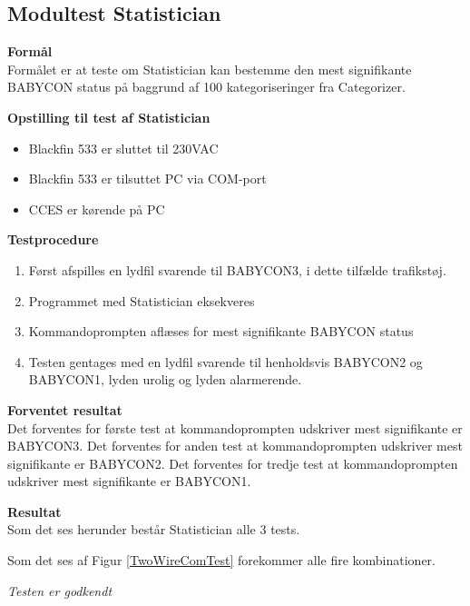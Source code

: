 \subsection{Modultest Statistician}

\textbf{Formål} \\
Formålet er at teste om Statistician kan bestemme den mest signifikante BABYCON status på baggrund af 100 kategoriseringer fra Categorizer.

\textbf{Opstilling til test af Statistician}

\begin{itemize}
	\item Blackfin 533 er sluttet til 230VAC
	\item Blackfin 533 er tilsuttet PC via COM-port
	\item CCES er kørende på PC
\end{itemize}

\textbf{Testprocedure}
\begin{enumerate}
	\item Først afspilles en lydfil svarende til BABYCON3, i dette tilfælde trafikstøj.
	\item Programmet med Statistician eksekveres 
	\item Kommandoprompten aflæses for mest signifikante BABYCON status
	\item Testen gentages med en lydfil svarende til henholdsvis BABYCON2 og BABYCON1, lyden urolig og lyden alarmerende. 
\end{enumerate}

\textbf{Forventet resultat} \\
Det forventes for første test at kommandoprompten udskriver mest signifikante er BABYCON3.
Det forventes for anden test at kommandoprompten udskriver mest signifikante er BABYCON2.
Det forventes for tredje test at kommandoprompten udskriver mest signifikante er BABYCON1. 

\textbf{Resultat} \\
Som det ses herunder består Statistician alle 3 tests. 


Som det ses af Figur \ref{TwoWireComTest} forekommer alle fire kombinationer. \\



\textit{Testen er godkendt}